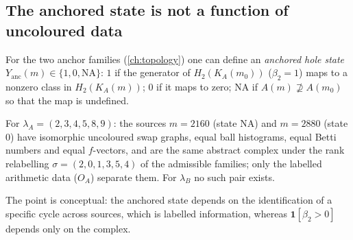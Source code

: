 \subsection{The anchored state is not a function of uncoloured data}
For the two anchor families (\cref{ch:topology}) one can define an \emph{anchored hole state} $Y_{\mathrm{anc}}(m)\in\{1,0,\mathrm{NA}\}$: $1$ if the generator of $H_2(K_A(m_0))$ ($\beta_2=1$) maps to a nonzero class in $H_2(K_A(m))$; $0$ if it maps to zero; $\mathrm{NA}$ if $A(m)\not\supseteq A(m_0)$ so that the map is undefined.
\begin{proposition}\label{prop:uncoloured-fails}
For $\lambda_A=(2,3,4,5,8,9)$: the sources $m=2160$ (state $\mathrm{NA}$) and $m=2880$ (state $0$) have isomorphic uncoloured swap graphs, equal ball histograms, equal Betti numbers and equal $f$-vectors, and are the same abstract complex under the rank relabelling $\sigma=(2,0,1,3,5,4)$ of the admissible families; only the labelled arithmetic data ($O_A$) separate them. For $\lambda_B$ no such pair exists.
\end{proposition}
The point is conceptual: the anchored state depends on the identification of a specific cycle across sources, which is labelled information, whereas $\mathbf 1[\beta_2>0]$ depends only on the complex.

